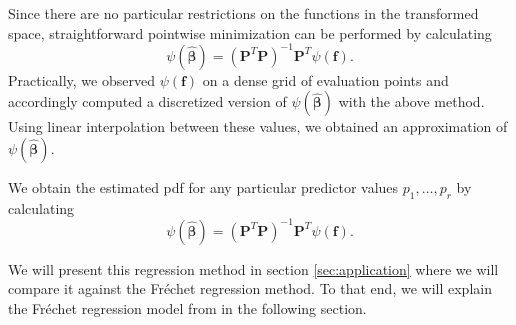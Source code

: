 Since there are no particular restrictions on the functions in the transformed space,
straightforward pointwise minimization can be performed by calculating
\begin{equation}
    \psi(\hat{\boldsymbol{\beta}})
    = \left(\mathbf{P}^T \mathbf{P}\right)^{-1} \mathbf{P}^T \psi(\mathbf{f}).
\end{equation}
Practically, we observed $\psi(\mathbf{f})$ on a dense grid of evaluation points and
accordingly computed a discretized version of $\psi(\hat{\boldsymbol{\beta}})$ with the
above method. Using linear interpolation between these values, we obtained an approximation
of $\psi(\hat{\boldsymbol{\beta}})$.

We obtain the estimated pdf for any particular predictor values $p_1, \dots, p_r$ by
calculating
\begin{equation}
    \psi(\hat{\boldsymbol{\beta}})
    = \left(\mathbf{P}^T \mathbf{P}\right)^{-1} \mathbf{P}^T \psi(\mathbf{f}).
\end{equation}

We will present this regression method in section \ref{sec:application} where we will
compare it against the Fréchet regression method. To that end, we will explain the
Fréchet regression model from \textcite{PetersenMüller2019} in the following section.
